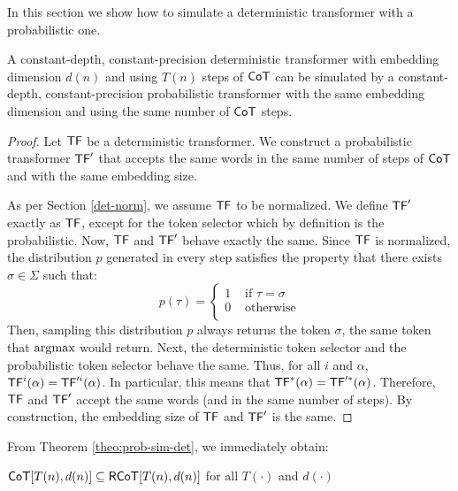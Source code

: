 In this section we show how to simulate a deterministic transformer with a probabilistic one.

\begin{theorem}\label{theo:prob-sim-det}
    A constant-depth, constant-precision deterministic transformer with embedding dimension $d(n)$ and using $T(n)$ steps of $\mathsf{CoT}$ can be simulated by a constant-depth, constant-precision  probabilistic transformer with the same embedding dimension and using the same number of $\mathsf{CoT}$ steps.
\end{theorem}


\begin{proof}
    Let $\mathsf{TF}$ be a deterministic transformer.
    We construct a probabilistic transformer $\mathsf{TF}'$ that accepts the same words in the same number of steps of $\mathsf{CoT}$ and with the same embedding size.
    
    As per Section \ref{det-norm}, we assume $\mathsf{TF}$ to be normalized.
    We define $\mathsf{TF}'$ exactly as $\mathsf{TF}$, except for the token selector which by definition is the probabilistic.
    Now, $\mathsf{TF}$ and $\mathsf{TF}'$ behave exactly the same.
    Since $\mathsf{TF}$ is normalized, the distribution $p$ generated in every step satisfies the property that there exists $\sigma \in \Sigma$ such that:
    \[
    p(\tau) =  \begin{cases}
        1 & \text{ if } \tau = \sigma \\
        0 & \text{ otherwise} \\
        \end{cases}
        \]
        Then, sampling this distribution $p$ always returns the token $\sigma$, the same token that $\mathrm{argmax}$ would return.
        Next, the deterministic token selector and the probabilistic token selector behave the same.
        Thus, for all $i$ and $\alpha$, $\mathsf{TF}^i(\alpha) = \mathsf{TF}'^i(\alpha)$.
        In particular, this means that $\mathsf{TF}^*(\alpha) = \mathsf{TF}'^*(\alpha)$.
        Therefore, $\mathsf{TF}$ and $\mathsf{TF}'$ accept the same words (and in the same number of steps).
        By construction, the embedding size of $\mathsf{TF}$ and $\mathsf{TF}'$ is the same.
\end{proof}

From Theorem \ref{theo:prob-sim-det}, we immediately obtain:

\begin{theorem}
    $\mathsf{CoT}[T(n), d(n)] \subseteq \mathsf{RCoT}[T(n), d(n)]$ for all $T(\cdot)$ and $d(\cdot)$
\end{theorem}





